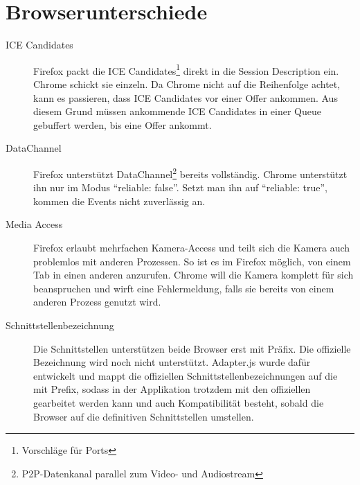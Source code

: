 	\section{Browserunterschiede}
		\begin{description}
			\item[ICE Candidates] Firefox packt die ICE Candidates\footnote{Vorschläge
			für Ports} direkt in die Session Description ein. Chrome schickt sie einzeln.
			Da Chrome nicht auf die Reihenfolge achtet, kann es passieren, dass ICE
			Candidates vor einer Offer ankommen. Aus diesem Grund müssen ankommende ICE
			Candidates in einer Queue gebuffert werden, bis eine Offer ankommt.
		
			\item[DataChannel] Firefox unterstützt DataChannel\footnote{P2P-Datenkanal parallel zum Video-
			und Audiostream} bereits vollständig. Chrome unterstützt ihn nur im Modus
			"`reliable: false"'. Setzt man ihn auf "`reliable: true"', kommen die Events
			nicht zuverlässig an.
			
			\item[Media Access] Firefox erlaubt mehrfachen Kamera-Access und teilt sich
			die Kamera auch problemlos mit anderen Prozessen. So ist es im Firefox
			möglich, von einem Tab in einen anderen anzurufen. Chrome will die Kamera komplett für sich beanspruchen und wirft eine Fehlermeldung, falls sie bereits von einem anderen Prozess genutzt wird.
			
			\item[Schnittstellenbezeichnung] Die Schnittstellen unterstützen beide
			Browser erst mit Präfix. Die offizielle Bezeichnung wird noch nicht unterstützt. Adapter.js wurde dafür entwickelt und mappt die offiziellen Schnittstellenbezeichnungen auf die mit Prefix, sodass in der Applikation trotzdem mit den offiziellen gearbeitet werden kann und auch Kompatibilität besteht, sobald die Browser auf die definitiven Schnittstellen umstellen.
	 	\end{description}